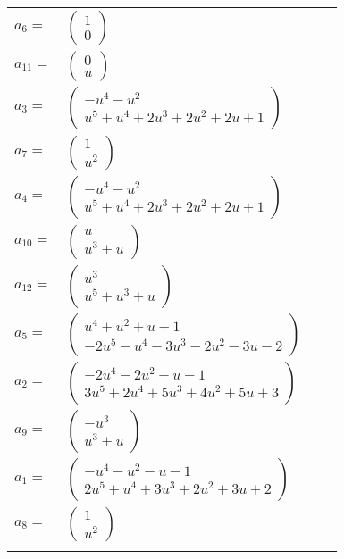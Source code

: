 \documentclass[1p]{elsarticle_modified}
\theoremstyle{definition}
\begin{document}
\begin{tabular}{m{7pt} m{180pt} m{7pt} m{180pt} }
\flushright $a_{6}=$&$\begin{pmatrix}1\\0\end{pmatrix}$ \\
\flushright $a_{11}=$&$\begin{pmatrix}0\\u\end{pmatrix}$ \\
\flushright $a_{3}=$&$\begin{pmatrix}- u^4- u^2\\u^5+u^4+2 u^3+2 u^2+2 u+1\end{pmatrix}$ \\
\flushright $a_{7}=$&$\begin{pmatrix}1\\u^2\end{pmatrix}$ \\
\flushright $a_{4}=$&$\begin{pmatrix}- u^4- u^2\\u^5+u^4+2 u^3+2 u^2+2 u+1\end{pmatrix}$ \\
\flushright $a_{10}=$&$\begin{pmatrix}u\\u^3+u\end{pmatrix}$ \\
\flushright $a_{12}=$&$\begin{pmatrix}u^3\\u^5+u^3+u\end{pmatrix}$ \\
\flushright $a_{5}=$&$\begin{pmatrix}u^4+u^2+u+1\\-2 u^5- u^4-3 u^3-2 u^2-3 u-2\end{pmatrix}$ \\
\flushright $a_{2}=$&$\begin{pmatrix}-2 u^4-2 u^2- u-1\\3 u^5+2 u^4+5 u^3+4 u^2+5 u+3\end{pmatrix}$ \\
\flushright $a_{9}=$&$\begin{pmatrix}- u^3\\u^3+u\end{pmatrix}$ \\
\flushright $a_{1}=$&$\begin{pmatrix}- u^4- u^2- u-1\\2 u^5+u^4+3 u^3+2 u^2+3 u+2\end{pmatrix}$ \\
\flushright $a_{8}=$&$\begin{pmatrix}1\\u^2\end{pmatrix}$\\&\end{tabular}
\end{document}
